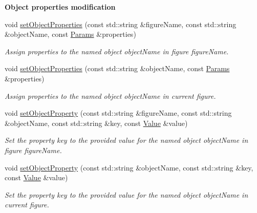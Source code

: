 \begin{Indent}\textbf{ Object properties modification}\par
\begin{DoxyCompactItemize}
\item 
void \hyperlink{group__drawing_ga62444280a2ae27683063e4229d966da6}{set\+Object\+Properties} (const std\+::string \&figure\+Name, const std\+::string \&object\+Name, const \hyperlink{classvibes_1_1_params}{Params} \&properties)
\begin{DoxyCompactList}\small\item\em Assign {\itshape properties} to the named object {\itshape object\+Name} in figure {\itshape figure\+Name}. \end{DoxyCompactList}\item 
void \hyperlink{group__drawing_ga7e66750e7e8b095c92762f8632a1f954}{set\+Object\+Properties} (const std\+::string \&object\+Name, const \hyperlink{classvibes_1_1_params}{Params} \&properties)
\begin{DoxyCompactList}\small\item\em Assign {\itshape properties} to the named object {\itshape object\+Name} in current figure. \end{DoxyCompactList}\item 
void \hyperlink{group__drawing_gaec9511af44b50c7f5bad3ea1dcebeb85}{set\+Object\+Property} (const std\+::string \&figure\+Name, const std\+::string \&object\+Name, const std\+::string \&key, const \hyperlink{classvibes_1_1_value}{Value} \&value)
\begin{DoxyCompactList}\small\item\em Set the property {\itshape key} to the provided {\itshape value} for the named object {\itshape object\+Name} in figure {\itshape figure\+Name}. \end{DoxyCompactList}\item 
void \hyperlink{group__drawing_ga8b6e96cfeb43d967950940fa388b5574}{set\+Object\+Property} (const std\+::string \&object\+Name, const std\+::string \&key, const \hyperlink{classvibes_1_1_value}{Value} \&value)
\begin{DoxyCompactList}\small\item\em Set the property {\itshape key} to the provided {\itshape value} for the named object {\itshape object\+Name} in current figure. \end{DoxyCompactList}\end{DoxyCompactItemize}
\end{Indent}
